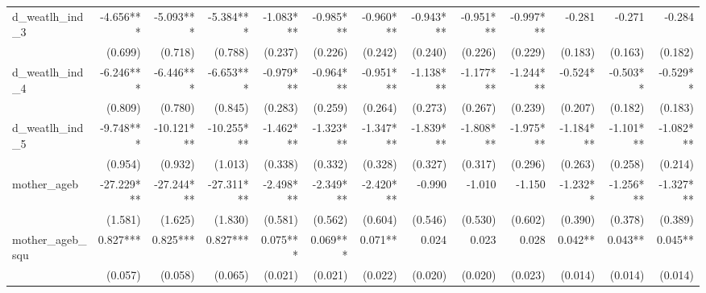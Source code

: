 \begin{tabular}{lrrrrrrrrrrrr}
d\_weatlh\_ind\_3                           &    -4.656*** &    -5.093*** &    -5.384*** &    -1.083*** &    -0.985*** &    -0.960*** &    -0.943*** &    -0.951*** &    -0.997*** &       -0.281 &       -0.271 &       -0.284 \\ 
                                            &      (0.699) &      (0.718) &      (0.788) &      (0.237) &      (0.226) &      (0.242) &      (0.240) &      (0.226) &      (0.229) &      (0.183) &      (0.163) &      (0.182) \\ 
d\_weatlh\_ind\_4                           &    -6.246*** &    -6.446*** &    -6.653*** &    -0.979*** &    -0.964*** &    -0.951*** &    -1.138*** &    -1.177*** &    -1.244*** &      -0.524* &     -0.503** &     -0.529** \\ 
                                            &      (0.809) &      (0.780) &      (0.845) &      (0.283) &      (0.259) &      (0.264) &      (0.273) &      (0.267) &      (0.239) &      (0.207) &      (0.182) &      (0.183) \\ 
d\_weatlh\_ind\_5                           &    -9.748*** &   -10.121*** &   -10.255*** &    -1.462*** &    -1.323*** &    -1.347*** &    -1.839*** &    -1.808*** &    -1.975*** &    -1.184*** &    -1.101*** &    -1.082*** \\ 
                                            &      (0.954) &      (0.932) &      (1.013) &      (0.338) &      (0.332) &      (0.328) &      (0.327) &      (0.317) &      (0.296) &      (0.263) &      (0.258) &      (0.214) \\ 
mother\_ageb                                &   -27.229*** &   -27.244*** &   -27.311*** &    -2.498*** &    -2.349*** &    -2.420*** &       -0.990 &       -1.010 &       -1.150 &     -1.232** &    -1.256*** &    -1.327*** \\ 
                                            &      (1.581) &      (1.625) &      (1.830) &      (0.581) &      (0.562) &      (0.604) &      (0.546) &      (0.530) &      (0.602) &      (0.390) &      (0.378) &      (0.389) \\ 
mother\_ageb\_squ                           &     0.827*** &     0.825*** &     0.827*** &     0.075*** &     0.069*** &      0.071** &        0.024 &        0.023 &        0.028 &      0.042** &      0.043** &      0.045** \\ 
                                            &      (0.057) &      (0.058) &      (0.065) &      (0.021) &      (0.021) &      (0.022) &      (0.020) &      (0.020) &      (0.023) &      (0.014) &      (0.014) &      (0.014) \\ 

\end{tabular}
